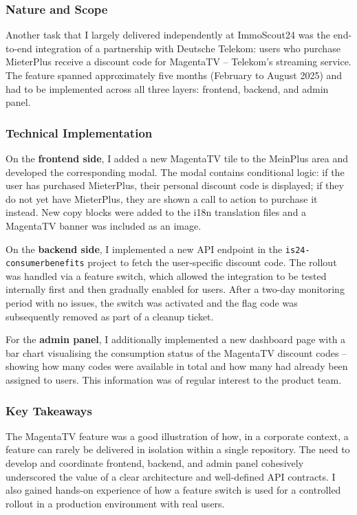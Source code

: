\documentclass[a4paper, 12pt]{article}
\begin{document}
\subsubsection*{Nature and Scope}

Another task that I largely delivered independently at ImmoScout24 was the end-to-end
integration of a partnership with Deutsche Telekom: users who purchase MieterPlus
receive a discount code for MagentaTV -- Telekom's streaming service. The feature
spanned approximately five months (February to August 2025) and had to be implemented
across all three layers: frontend, backend, and admin panel.

\subsubsection*{Technical Implementation}

On the \textbf{frontend side}, I added a new MagentaTV tile to the MeinPlus area and
developed the corresponding modal. The modal contains conditional logic: if the user
has purchased MieterPlus, their personal discount code is displayed; if they do not
yet have MieterPlus, they are shown a call to action to purchase it instead. New copy
blocks were added to the i18n translation files and a MagentaTV banner was included
as an image.

On the \textbf{backend side}, I implemented a new API endpoint in the
\texttt{is24-consumerbenefits} project to fetch the user-specific discount code. The
rollout was handled via a feature switch, which allowed the integration to be tested
internally first and then gradually enabled for users. After a two-day monitoring
period with no issues, the switch was activated and the flag code was subsequently
removed as part of a cleanup ticket.

For the \textbf{admin panel}, I additionally implemented a new dashboard page with a
bar chart visualising the consumption status of the MagentaTV discount codes -- showing
how many codes were available in total and how many had already been assigned to users.
This information was of regular interest to the product team.

\subsubsection*{Key Takeaways}

The MagentaTV feature was a good illustration of how, in a corporate context, a feature
can rarely be delivered in isolation within a single repository. The need to develop and
coordinate frontend, backend, and admin panel cohesively underscored the value of a
clear architecture and well-defined API contracts. I also gained hands-on experience
of how a feature switch is used for a controlled rollout in a production environment
with real users.
\end{document}
